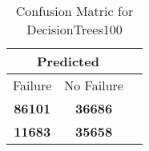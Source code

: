 \begin{table}[] 
\caption{Confusion Matric for DecisionTrees100} 
\label{Table: Prediction Accuracy-DMDDecisionTrees100OnlySunEKF-resetReflectionEKF-top2-Reflection} 
\centering 
\begin{tabular} 
 {@{}ccc@{}} 
\toprule 
\multicolumn{2}{c}{\textbf{Predicted}}
 \\ \midrule 
\multicolumn{1}{|c|}{Failure} & 
\multicolumn{1}{c|}{No Failure}
 \\ \midrule 
\multicolumn{1}{|c|}{\color{green}\textbf{86101}} & 
\multicolumn{1}{c|}{\color{green}\textbf{36686}}
 \\ \midrule 
\multicolumn{1}{|c|}{\color{red}\textbf{11683}} & 
\multicolumn{1}{c|}{\color{red}\textbf{35658}}
 \\ \bottomrule 
\end{tabular} 
\end{table} 
